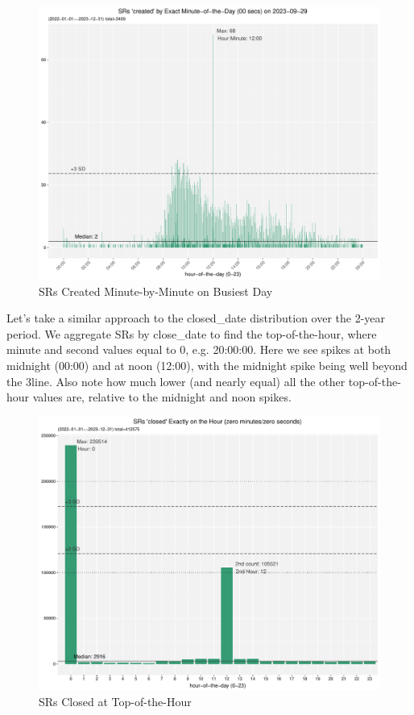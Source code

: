 \documentclass[12pt, titlepage]{article}
\begin{document}
{	\begin{figure}[tbp]
		\centering
		\includegraphics[width=\textwidth]
		{2-year-trend-SR_created_by_minute_of_busiest_day.pdf}
		\caption{SRs Created Minute-by-Minute on Busiest Day}
		\label{fig:busiestcreated}
	\end{figure}	

	Let's take a similar approach to the closed\_date distribution over the 
	2-year period. We aggregate SRs by close\_date to find the top-of-the-hour, 
	where minute and second values equal to 0, e.g. 20:00:00. Here we see 
	spikes at both midnight (00:00) and at noon (12:00), with the midnight 
	spike being well beyond the 3\textsigma line. Also note how much lower 
	(and nearly equal) all the other top-of-the-hour values are, 
	relative to the midnight and noon spikes. 
	
	\begin{figure}[tbp]
		\centering
		\includegraphics[width = \textwidth]
		{2-year-trend-SR_closed_by_top_of_hour.pdf}
		\caption{SRs Closed at Top-of-the-Hour}
		\label{fig:tophourclosed}
	\end{figure}
	
}
\end{document}
